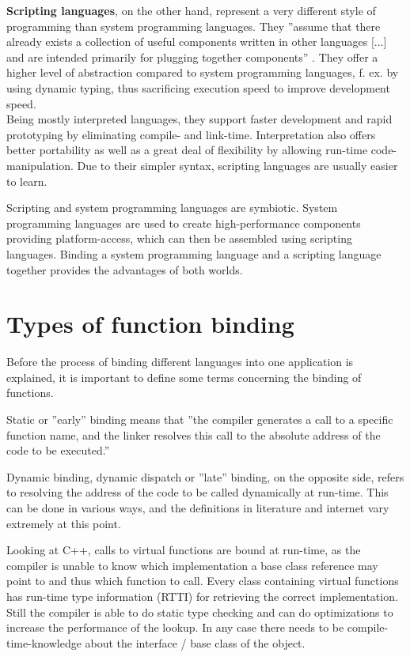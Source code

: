 \textbf{Scripting languages}, on the other hand, represent a very different style of programming than system programming languages. They ''assume that there already exists a collection of useful components written in other languages [...] and are intended primarily for plugging together components'' . They offer a higher level of abstraction compared to system programming languages, f. ex. by using dynamic typing, thus sacrificing execution speed to improve development speed.\\ Being mostly interpreted languages, they support faster development and rapid prototyping by eliminating compile- and link-time. Interpretation also offers better portability as well as a great deal of flexibility by allowing run-time code-manipulation. Due to their simpler syntax, scripting languages are usually easier to learn.

Scripting and system programming languages are symbiotic. System programming languages are used to create high-performance components providing platform-access, which can then be assembled using scripting languages. Binding a system programming language and a scripting language together provides the advantages of both worlds.


\section{Types of function binding}

Before the process of binding different languages into one application is explained, it is important to define some terms concerning the binding of functions.

Static or ''early'' binding means that ''the compiler generates a call to a specific function name, and the linker resolves this call to the absolute address of the code to be executed.'' 

Dynamic binding, dynamic dispatch or ''late'' binding, on the opposite side, refers to resolving the address of the code to be called dynamically at run-time. This can be done in various ways, and the definitions in literature and internet vary extremely at this point.

Looking at C++, calls to virtual functions are bound at run-time, as the compiler is unable to know which implementation a base class reference may point to and thus which function to call. Every class containing virtual functions has run-time type information (RTTI) for retrieving the correct implementation. Still the compiler is able to do static type checking and can do optimizations to increase the performance of the lookup. In any case there needs to be compile-time-knowledge about the interface / base class of the object. 

